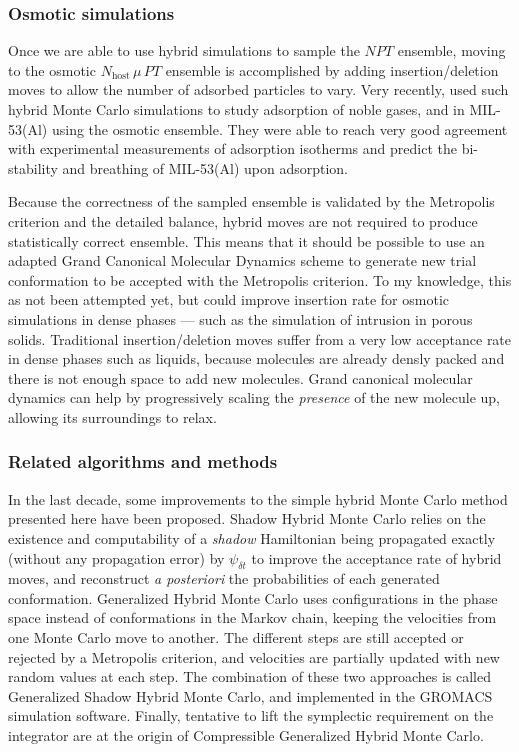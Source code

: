 \documentclass[thesis]{subfiles}
\begin{document}
\subsubsection{Osmotic simulations}

Once we are able to use hybrid simulations to sample the $NPT$ ensemble, moving
to the osmotic $N_\text{host}\,\mu\,PT$ ensemble is accomplished by adding
insertion/deletion moves to allow the number of adsorbed particles to vary. Very
recently, \citeauthor{Rogge2019}\cite{Rogge2019} used such hybrid Monte Carlo
simulations to study adsorption of noble gases,  and  in
MIL-53(Al) using the osmotic ensemble. They were able to reach very good
agreement with experimental measurements of adsorption isotherms and predict the
bi-stability and breathing of MIL-53(Al) upon adsorption.

Because the correctness of the sampled ensemble is validated by the Metropolis
criterion and the detailed balance, hybrid moves are not required to produce
statistically correct ensemble. This means that it should be possible to use an
adapted Grand Canonical Molecular Dynamics scheme to generate new trial
conformation to be accepted with the Metropolis criterion. To my knowledge, this
as not been attempted yet, but could improve insertion rate for osmotic
simulations in dense phases --- such as the simulation of intrusion in porous
solids. Traditional insertion/deletion moves suffer from a very low acceptance
rate in dense phases such as liquids, because molecules are already densly
packed and there is not enough space to add new molecules. Grand canonical
molecular dynamics can help by progressively scaling the \emph{presence} of the
new molecule up, allowing its surroundings to relax.

\subsubsection{Related algorithms and methods}

In the last decade, some improvements to the simple hybrid Monte Carlo method
presented here have been proposed. Shadow Hybrid Monte Carlo\cite{Izaguirre2004}
relies on the existence and computability of a \emph{shadow} Hamiltonian being
propagated exactly (without any propagation error) by $\psi_{\delta t}$ to
improve the acceptance rate of hybrid moves, and reconstruct \emph{a posteriori}
the probabilities of each generated conformation. Generalized Hybrid Monte
Carlo\cite{Akhmatskaya2009, Akhmatskaya2011} uses configurations in the phase
space instead of conformations in the Markov chain, keeping the velocities from
one Monte Carlo move to another. The different steps are still accepted or
rejected by a Metropolis criterion, and velocities are partially updated with
new random values at each step. The combination of these two approaches is
called Generalized Shadow Hybrid Monte Carlo, and implemented in the GROMACS
simulation software\cite{FernandezPendas2014}. Finally, tentative to lift
the symplectic requirement on the integrator are at the origin of Compressible
Generalized Hybrid Monte Carlo\cite{Fang2014}.
\end{document}
